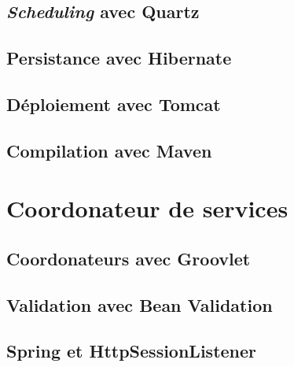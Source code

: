 \documentclass{article}
\begin{document}
\subsection{\emph{Scheduling} avec Quartz} %
\label{sub:scheduling_avec_quartz}

\subsection{Persistance avec Hibernate} %
\label{sub:persistance_avec_hibernate}

\subsection{Déploiement avec Tomcat} %
\label{sub:deploiement_avec_tomcat}

\subsection{Compilation avec Maven} %
\label{sub:service_metier_compilation_avec_maven}


\section{Coordonateur de services} %
\label{sec:coordonateur_de_services}

\subsection{Coordonateurs avec Groovlet} %
\label{sub:coordonateurs_avec_groovlet}

\subsection{Validation avec Bean Validation} %
\label{sub:validation_avec_bean_validation}

\subsection{Spring et HttpSessionListener} %
\label{sub:spring_et_httpsessionlistener}
\end{document}
